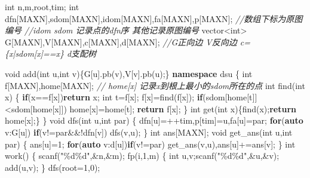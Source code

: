 \documentclass[
]{article}
\newenvironment{Shaded}{}{}
\newcommand{\CommentTok}[1]{\textcolor[rgb]{0.38,0.63,0.69}{\textit{#1}}}
\newcommand{\ControlFlowTok}[1]{\textcolor[rgb]{0.00,0.44,0.13}{\textbf{#1}}}
\newcommand{\DataTypeTok}[1]{\textcolor[rgb]{0.56,0.13,0.00}{#1}}
\newcommand{\DecValTok}[1]{\textcolor[rgb]{0.25,0.63,0.44}{#1}}
\newcommand{\KeywordTok}[1]{\textcolor[rgb]{0.00,0.44,0.13}{\textbf{#1}}}
\newcommand{\NormalTok}[1]{#1}
\newcommand{\SpecialCharTok}[1]{\textcolor[rgb]{0.25,0.44,0.63}{#1}}
\newcommand{\StringTok}[1]{\textcolor[rgb]{0.25,0.44,0.63}{#1}}
\begin{document}
\begin{Shaded}
\begin{Highlighting}[]
\DataTypeTok{int}\NormalTok{ n,m,root,tim;}
\DataTypeTok{int}\NormalTok{ dfn[MAXN],sdom[MAXN],idom[MAXN],fa[MAXN],p[MAXN];}
\CommentTok{//数组下标为原图编号}
\CommentTok{//idom sdom 记录点的dfn序 其他记录原图编号}
\NormalTok{vector\textless{}}\DataTypeTok{int}\NormalTok{\textgreater{} G[MAXN],V[MAXN],c[MAXN],d[MAXN];}
\CommentTok{//G正向边 V反向边 c=\{x|sdom[x]==x\} d支配树}

\DataTypeTok{void}\NormalTok{ add(}\DataTypeTok{int}\NormalTok{ u,}\DataTypeTok{int}\NormalTok{ v)\{G[u].pb(v),V[v].pb(u);\}}
\KeywordTok{namespace}\NormalTok{ dsu}
\NormalTok{\{}
    \DataTypeTok{int}\NormalTok{ f[MAXN],home[MAXN];}
    \CommentTok{// home[x] 记录x到根上最小的sdom所在的点}
    \DataTypeTok{int}\NormalTok{ find(}\DataTypeTok{int}\NormalTok{ x)}
\NormalTok{    \{}
        \ControlFlowTok{if}\NormalTok{(x==f[x])}\ControlFlowTok{return}\NormalTok{ x;}
        \DataTypeTok{int}\NormalTok{ t=f[x];}
\NormalTok{        f[x]=find(f[x]);}
        \ControlFlowTok{if}\NormalTok{(sdom[home[t]]\textless{}sdom[home[x]])}
\NormalTok{            home[x]=home[t];}
        \ControlFlowTok{return}\NormalTok{ f[x];        }
\NormalTok{    \}}
    \DataTypeTok{int}\NormalTok{ get(}\DataTypeTok{int}\NormalTok{ x)\{find(x);}\ControlFlowTok{return}\NormalTok{ home[x];\}}
\NormalTok{\}}
\DataTypeTok{void}\NormalTok{ dfs(}\DataTypeTok{int}\NormalTok{ u,}\DataTypeTok{int}\NormalTok{ par)}
\NormalTok{\{}
\NormalTok{    dfn[u]=++tim,p[tim]=u,fa[u]=par;}
    \ControlFlowTok{for}\NormalTok{(}\KeywordTok{auto}\NormalTok{ v:G[u])}
        \ControlFlowTok{if}\NormalTok{(v!=par\&\&!dfn[v])}
\NormalTok{            dfs(v,u);}
\NormalTok{\}}
\DataTypeTok{int}\NormalTok{ ans[MAXN];}
\DataTypeTok{void}\NormalTok{ get\_ans(}\DataTypeTok{int}\NormalTok{ u,}\DataTypeTok{int}\NormalTok{ par)}
\NormalTok{\{}
\NormalTok{    ans[u]=}\DecValTok{1}\NormalTok{;}
    \ControlFlowTok{for}\NormalTok{(}\KeywordTok{auto}\NormalTok{ v:d[u])}\ControlFlowTok{if}\NormalTok{(v!=par)}
\NormalTok{        get\_ans(v,u),ans[u]+=ans[v];}
\NormalTok{\}}
\DataTypeTok{int}\NormalTok{ work()}
\NormalTok{\{}
\NormalTok{    scanf(}\StringTok{"}\SpecialCharTok{\%d\%d}\StringTok{"}\NormalTok{,\&n,\&m);}
\NormalTok{    fp(i,}\DecValTok{1}\NormalTok{,m)}
\NormalTok{    \{}
        \DataTypeTok{int}\NormalTok{ u,v;scanf(}\StringTok{"}\SpecialCharTok{\%d\%d}\StringTok{"}\NormalTok{,\&u,\&v);}
\NormalTok{        add(u,v);}
\NormalTok{    \}}
\NormalTok{    dfs(root=}\DecValTok{1}\NormalTok{,}\DecValTok{0}\NormalTok{);}

\end{Highlighting}
\end{Shaded}
\end{document}
